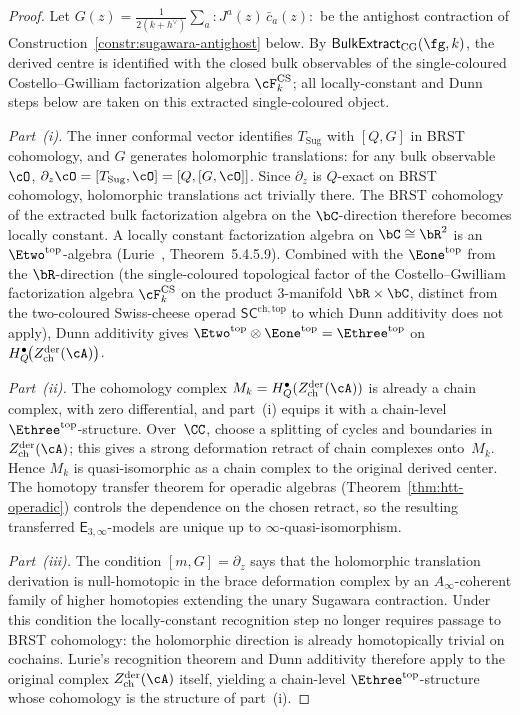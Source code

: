 \begin{proof}
Let
$G(z) = \frac{1}{2(k+h^\vee)}\sum_a {:}J^a(z)\,\bar c_a(z){:}$
be the antighost contraction of
Construction~\ref{constr:sugawara-antighost} below.
By $\mathsf{BulkExtract}_{\mathrm{CG}}(\fg,k)$, the derived
centre is identified with the closed bulk observables of the
single-coloured Costello--Gwilliam factorization algebra
$\cF^{\mathrm{CS}}_k$; all locally-constant and Dunn steps below
are taken on this extracted single-coloured object.

\emph{Part~\textup{(i)}.}
The inner conformal vector identifies
$T_{\mathrm{Sug}}$ with $[Q, G]$ in BRST cohomology, and
$G$ generates holomorphic translations: for any bulk
observable $\cO$,
$\partial_z \cO = [T_{\mathrm{Sug}}, \cO]
= [Q, [G, \cO]]$.
Since $\partial_z$ is $Q$-exact on BRST cohomology,
holomorphic translations act trivially there. The BRST
cohomology of the extracted bulk factorization algebra on the
$\bC$-direction therefore becomes locally constant. A
locally constant factorization algebra on
$\bC \cong \bR^2$ is an $\Etwo^{\mathrm{top}}$-algebra
\textup{(}Lurie~\cite{HA}, Theorem~5.4.5.9\textup{)}.
Combined with the $\Eone^{\mathrm{top}}$ from the
$\bR$-direction (the single-coloured topological factor of the
Costello--Gwilliam factorization algebra
$\cF^{\mathrm{CS}}_k$ on the product $3$-manifold
$\bR \times \bC$, distinct from the two-coloured
Swiss-cheese operad $\mathsf{SC}^{\mathrm{ch,top}}$ to
which Dunn additivity does not apply),
Dunn additivity gives
$\Etwo^{\mathrm{top}} \otimes \Eone^{\mathrm{top}}
= \Ethree^{\mathrm{top}}$ on
$H_Q^\bullet\!\bigl(Z^{\mathrm{der}}_{\mathrm{ch}}(\cA)\bigr)$.

\emph{Part~\textup{(ii)}.}
The cohomology complex
$M_k = H_Q^\bullet(Z^{\mathrm{der}}_{\mathrm{ch}}(\cA))$
is already a chain complex, with zero differential, and
part~\textup{(i)} equips it with a chain-level
$\Ethree^{\mathrm{top}}$-structure. Over~$\CC$, choose a
splitting of cycles and boundaries in
$Z^{\mathrm{der}}_{\mathrm{ch}}(\cA)$; this gives a strong
deformation retract of chain complexes onto~$M_k$.
Hence $M_k$ is quasi-isomorphic as a chain complex to the
original derived center. The homotopy transfer theorem for
operadic algebras
\textup{(}Theorem~\textup{\ref{thm:htt-operadic}}\textup{)}
controls the dependence on the chosen retract, so the
resulting transferred $\mathsf{E}_{3,\infty}$-models are unique
up to $\infty$-quasi-isomorphism.

\emph{Part~\textup{(iii)}.}
The condition $[m, G] = \partial_z$ says that the
holomorphic translation derivation is null-homotopic in the
brace deformation complex by an $A_\infty$-coherent family of
higher homotopies extending the unary Sugawara contraction.
Under this condition the locally-constant recognition step no
longer requires passage to BRST cohomology: the holomorphic
direction is already homotopically trivial on cochains.
Lurie's recognition theorem and Dunn additivity therefore
apply to the original complex
$Z^{\mathrm{der}}_{\mathrm{ch}}(\cA)$ itself, yielding a
chain-level $\Ethree^{\mathrm{top}}$-structure whose
cohomology is the structure of part~\textup{(i)}.


\end{proof}

